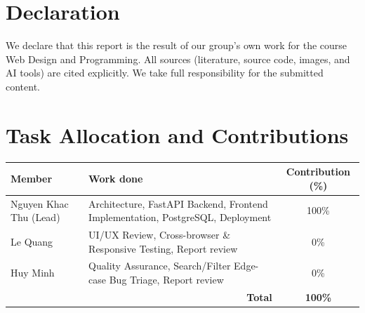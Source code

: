 \documentclass{fdareport}
\begin{document}
\maketitle
\section*{Declaration}
We declare that this report is the result of our group's own work for the course Web Design and
Programming. All sources (literature, source code, images, and AI tools) are cited explicitly.
We take full responsibility for the submitted content.
\section*{Task Allocation and Contributions}
\begin{center}\small
\renewcommand{\arraystretch}{1.3}
\begin{tabularx}{\textwidth}{@{}l X c@{}}
\toprule
\textbf{Member} & \textbf{Work done} & \textbf{Contribution (\%)}\\
\midrule
Nguyen Khac Thu (Lead) & Architecture, FastAPI Backend, Frontend Implementation, PostgreSQL, Deployment & 100\%\\
Le Quang & UI/UX Review, Cross-browser \& Responsive Testing, Report review & 0\%\\
Huy Minh & Quality Assurance, Search/Filter Edge-case Bug Triage, Report review & 0\%\\
\midrule
\multicolumn{2}{r}{\textbf{Total}} & \textbf{100\%}\\
\bottomrule
\end{tabularx}
\end{center}
\clearpage
\tableofcontents
\clearpage
\listoffigures
\listoftables
\clearpage




\clearpage
{}


\appendix

\end{document}

